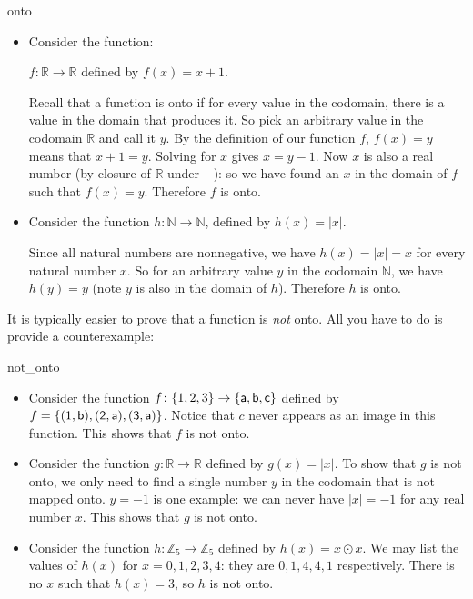 \begin{example}{onto}
\begin{itemize}
\item
 Consider the  function:

$f\colon \mathbb{R} \to \mathbb{R}$ defined by $f(x)=x +1$.

Recall that a function is onto if for every value in the codomain, there is a value in the domain that produces it.  
So pick an arbitrary value in the codomain $\mathbb{R}$ and call it $y$.  By the definition of our function $f$, $f(x)=y$ means that $x+1=y$.  Solving for $x$ gives $x = y - 1$.  Now $x$ is also a real number (by  closure of $\mathbb{R}$ under $-$): so we have found an $x$ in the domain of $f$ such that  $f(x) = y$.  Therefore $f$ is onto.

\item 
Consider the function 
$h\colon \mathbb{N} \to \mathbb{N}$, defined by $h(x)=|x|$.

Since all natural numbers are nonnegative, we have $h(x)=|x|=x$ for every natural number $x$.  So for an arbitrary value $y$ in the codomain $\mathbb{N}$, we have $h(y) = y$ (note $y$ is also in the domain of $h$). Therefore $h$ is onto.
\end{itemize}

\end{example}

It is typically easier to prove that a function is \emph{not} onto. All you have to do is provide a counterexample:

\begin{example}{not_onto} 
\begin{itemize}
\item
Consider the function $f\colon \{1,2,3\} \to \{\sf{a}, \sf{b},\sf{c}\}$ defined by $f=\{(1,\sf{b}),(2,\sf{a}),(3,\sf{a})\}$.
Notice that $c$ never appears as an image in this function.  This shows that $f$ is not onto. 
\item
Consider the function $g\colon \mathbb{R} \to \mathbb{R}$ defined by $g(x)= |x|$. To show that $g$ is not onto, we only need to find a single number $y$ in the codomain that  is not mapped onto.  $y=-1$ is one example: we can never have $|x|=-1$ for any real number $x$.  This shows that $g$ is not onto.
\item
Consider the function $h\colon \mathbb{Z}_5 \to \mathbb{Z}_5$ defined by $h(x)= x \odot x $. We may list the values of $h(x)$ for $x = 0,1,2,3,4$: they are $0,1,4,4,1$ respectively. There is no $x$ such that $h(x) = 3$, so $h$ is not onto.
\end{itemize}
\end{example}


